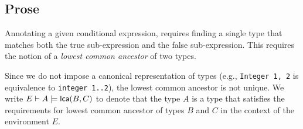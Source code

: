\documentclass{book}
\newcommand\lca[0]{\textsf{lca}}
\newcommand\lcasat[0]{\models}
\begin{document}
\subsection{Prose}
  Annotating a given conditional expression, requires finding a single type that matches both the true sub-expression and the false sub-expression. This requires the notion of a \emph{lowest common ancestor} of two types. 
\begin{comment}  
ROMAN: Perhaps we should move this to the next chapter, right before typing ECond?
\end{comment}
  Since we do not impose a canonical representation of types (e.g., \texttt{Integer {1, 2}} is equivalence to \texttt{integer {1..2}}), the lowest common ancestor is not unique. We write $E \entails A \lcasat \lca(B, C)$ to denote that the type $A$ is a type that satisfies the requirements for lowest common ancestor of types $B$ and $C$ in the context of the environment $E$.

\begin{comment}
ROMAN: intuitively, \texttt{if b then e1 else e2} should be equivalent to \texttt{var res : T; if b then res=e1; else res=e2;}. However, in the second form, we would find the least common type T using the type satisfaction (or can-be-assigned-to) relation and I'm not sure the definition of \lca\ matches that. If it does, we can simplify it a lot.
\end{comment}
\end{document}
